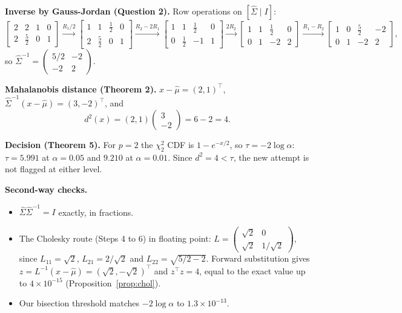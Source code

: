 \documentclass[11pt]{article}
\newcommand{\T}{^{\top}}
\newcommand{\hSigma}{\hat{\Sigma}}
\newcommand{\hmu}{\hat{\mu}}
\theoremstyle{plain}
\begin{document}
\textbf{Inverse by Gauss-Jordan (Question 2).} Row operations on $[\hSigma\mid I]$:
\[
\left[\begin{array}{cc|cc}2&2&1&0\\2&\tfrac52&0&1\end{array}\right]
\xrightarrow{R_1/2}
\left[\begin{array}{cc|cc}1&1&\tfrac12&0\\2&\tfrac52&0&1\end{array}\right]
\xrightarrow{R_2-2R_1}
\left[\begin{array}{cc|cc}1&1&\tfrac12&0\\0&\tfrac12&-1&1\end{array}\right]
\xrightarrow{2R_2}
\left[\begin{array}{cc|cc}1&1&\tfrac12&0\\0&1&-2&2\end{array}\right]
\xrightarrow{R_1-R_2}
\left[\begin{array}{cc|cc}1&0&\tfrac52&-2\\0&1&-2&2\end{array}\right],
\]
so $\hSigma^{-1}=\begin{pmatrix}5/2&-2\\-2&2\end{pmatrix}$.

\textbf{Mahalanobis distance (Theorem 2).} $x-\hmu=(2,1)\T$,
$\hSigma^{-1}(x-\hmu)=(3,-2)\T$, and
\[
d^2(x)=(2,1)\begin{pmatrix}3\\-2\end{pmatrix}=6-2=4.
\]

\textbf{Decision (Theorem 5).} For $p=2$ the $\chi^2_2$ CDF is $1-e^{-x/2}$, so
$\tau=-2\log\alpha$: $\tau=5.991$ at $\alpha=0.05$ and $9.210$ at $\alpha=0.01$. Since
$d^2=4<\tau$, the new attempt is not flagged at either level.

\textbf{Second-way checks.}
\begin{itemize}[nosep]
\item $\hSigma\hSigma^{-1}=I$ exactly, in fractions.
\item The Cholesky route (Steps 4 to 6) in floating point:
  $L=\begin{pmatrix}\sqrt2&0\\\sqrt2&1/\sqrt2\end{pmatrix}$, since $L_{11}=\sqrt2$,
  $L_{21}=2/\sqrt2$ and $L_{22}=\sqrt{5/2-2}$. Forward substitution gives
  $z=L^{-1}(x-\hmu)=(\sqrt2,-\sqrt2)\T$ and $z\T z=4$, equal to the exact value up to
  $4\times10^{-15}$ (Proposition~\ref{prop:chol}).
\item Our bisection threshold matches $-2\log\alpha$ to $1.3\times10^{-13}$.
\end{itemize}
\end{document}
